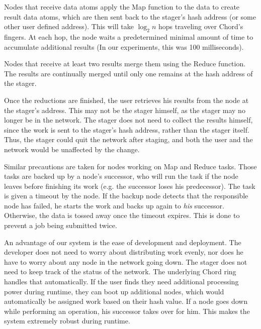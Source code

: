 Nodes that receive data atoms apply the Map function to the data to create result data atoms, which are then sent back to the stager's hash address (or some other user defined address).  This will take $\log_{2} n$ hops traveling over Chord's fingers.  At each hop, the node waits a predetermined minimal amount of time to accumulate additional results (In our experiments, this was 100 milliseconds).

Nodes that receive at least two results merge them using the Reduce function.  The results are continually merged until only one remains at the hash address of the stager. 

Once the reductions are finished, the user retrieves his results from the node at the stager's address.  This may not be the stager himself, as the stager may no longer be in the network.  The stager does not need to collect the results himself, since the work is sent to the stager's hash address, rather than the stager itself.  Thus, the stager could quit the network after staging, and both the user and the network would be unaffected by the change. %

Similar precautions are taken for nodes working on Map and Reduce tasks.  Those tasks are backed up by a node's successor, who will run the task if the node leaves before finishing its work (e.g. the successor loses his predecessor).   The task is given a timeout by the node.  If the backup node detects that the responsible node has failed, he starts the work and backs up again to \emph{his} successor.  Otherwise, the data is tossed away once the timeout expires. This is done to prevent a job being submitted twice.

An advantage of our system is the ease of development and deployment.  The developer does not need to worry about distributing work evenly, nor does he have to worry about any node in the network going down.  The stager does not need to keep track of the status of the network.  The underlying Chord ring handles that automatically.  If the user finds they need additional processing power during runtime, they can boot up additional nodes, which would automatically be assigned work based on their hash value.   If a node goes down while performing an operation, his successor takes over for him.  This makes the system extremely robust during runtime.

